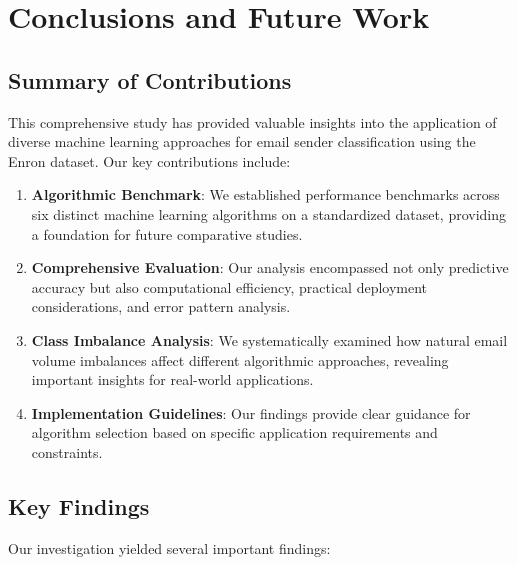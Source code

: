 \documentclass[11pt,a4paper]{article}
\begin{document}
\section{Conclusions and Future Work}

\subsection{Summary of Contributions}

This comprehensive study has provided valuable insights into the application of diverse machine learning approaches for email sender classification using the Enron dataset. Our key contributions include:

\begin{enumerate}
    \item \textbf{Algorithmic Benchmark}: We established performance benchmarks across six distinct machine learning algorithms on a standardized dataset, providing a foundation for future comparative studies.
    
    \item \textbf{Comprehensive Evaluation}: Our analysis encompassed not only predictive accuracy but also computational efficiency, practical deployment considerations, and error pattern analysis.
    
    \item \textbf{Class Imbalance Analysis}: We systematically examined how natural email volume imbalances affect different algorithmic approaches, revealing important insights for real-world applications.
    
    \item \textbf{Implementation Guidelines}: Our findings provide clear guidance for algorithm selection based on specific application requirements and constraints.
\end{enumerate}

\subsection{Key Findings}

Our investigation yielded several important findings:
\end{document}
